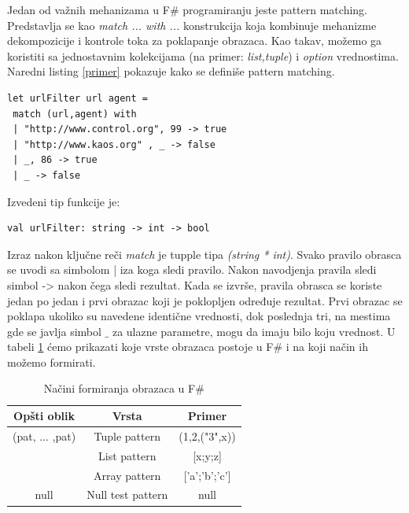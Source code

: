 \documentclass[a4paper]{article}
\begin{document}
Jedan od važnih mehanizama u F\# programiranju jeste pattern matching. Predstavlja se kao {\em match ... with ...} konstrukcija koja kombinuje mehanizme dekompozicije i kontrole toka za poklapanje obrazaca. Kao takav, možemo ga koristiti sa  jednostavnim kolekcijama (na primer: {\em list,tuple}) i {\em option} vrednostima. Naredni listing \ref{primer} pokazuje kako se definiše pattern matching.
\\
\begin{lstlisting}[caption={Primer pattern matching-a\cite{expertFS}},frame=single, label=primer]
let urlFilter url agent =
 match (url,agent) with
 | "http://www.control.org", 99 -> true
 | "http://www.kaos.org" , _ -> false
 | _, 86 -> true
 | _ -> false
\end{lstlisting} 

Izvedeni tip funkcije je:

\begin{lstlisting}
val urlFilter: string -> int -> bool
\end{lstlisting}

Izraz nakon ključne reči {\em match} je tupple tipa {\em (string * int)}. Svako pravilo obrasca se uvodi sa simbolom | iza koga sledi pravilo. Nakon navodjenja pravila sledi simbol -> nakon čega sledi rezultat. Kada se izvrše, pravila obrasca se koriste jedan po jedan i prvi obrazac koji je poklopljen određuje rezultat. Prvi obrazac se poklapa ukoliko su navedene identične vrednosti, dok poslednja tri, na mestima gde se javlja simbol $\_$ za ulazne parametre, mogu da imaju bilo koju vrednost. U tabeli \ref{tab:tabela1} ćemo prikazati koje vrste obrazaca postoje u F\# i na koji način ih možemo formirati.
 
\begin{table}[h!]
\begin{center}
\caption{Načini formiranja obrazaca u F\#}
\begin{tabular}{|c|c|c|} \hline
\textbf{Opšti oblik}& \textbf{Vrsta}& \textbf{Primer}\\ \hline
(pat, ... ,pat) &Tuple pattern&(1,2,("3",x))
\\ \hline
[pat, ... ,pat] &List pattern&[x;y;z]\\ \hline
[|pat, ... ,pat|] &Array pattern&['a';'b';'c']\\ \hline
null &Null test pattern&null\\ \hline
\end{tabular}
\label{tab:tabela1}
\end{center}
\end{table}
\end{document}
